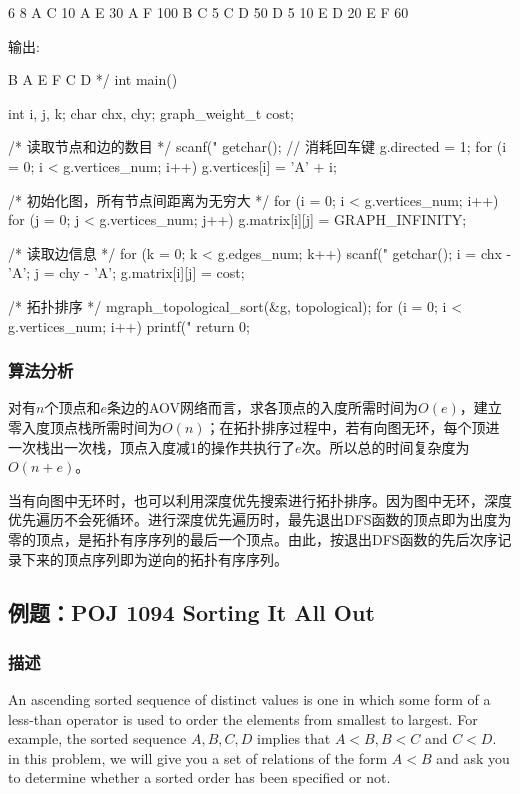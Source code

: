 \begin{Codex}[label=mgraph_topological_sort.c]
6 8
A C 10
A E 30
A F 100
B C 5
C D 50
D 5 10
E D 20
E F 60

输出:

B A E F C D
*/
int main() {
    int i, j, k;
    char chx, chy;
    graph_weight_t cost;

    /* 读取节点和边的数目 */
    scanf("%
    getchar(); // 消耗回车键
    g.directed = 1;
    for (i = 0; i < g.vertices_num; i++) g.vertices[i] = 'A' + i;

    /* 初始化图，所有节点间距离为无穷大 */
    for (i = 0; i < g.vertices_num; i++) {
        for (j = 0; j < g.vertices_num; j++) {
            g.matrix[i][j] = GRAPH_INFINITY;
        }
    }

    /* 读取边信息 */
    for (k = 0; k < g.edges_num; k++) {
        scanf("%
        getchar();
        i = chx - 'A';
        j = chy - 'A';
        g.matrix[i][j] = cost;
    }

    /* 拓扑排序 */
    mgraph_topological_sort(&g, topological);
    for (i = 0; i < g.vertices_num; i++) {
        printf("%
    }
    return 0;
}
\end{Codex}

\subsubsection{算法分析}
对有$n$个顶点和$e$条边的AOV网络而言，求各顶点的入度所需时间为$O(e)$，建立零入度顶点栈所需时间为$O(n)$；在拓扑排序过程中，若有向图无环，每个顶进一次栈出一次栈，顶点入度减1的操作共执行了$e$次。所以总的时间复杂度为$O(n+e)$。

当有向图中无环时，也可以利用深度优先搜索进行拓扑排序。因为图中无环，深度优先遍历不会死循环。进行深度优先遍历时，最先退出DFS函数的顶点即为出度为零的顶点，是拓扑有序序列的最后一个顶点。由此，按退出DFS函数的先后次序记录下来的顶点序列即为逆向的拓扑有序序列。


\subsection{例题：POJ 1094 Sorting It All Out}
\subsubsection{描述}
An ascending sorted sequence of distinct values is one in which some form of a less-than operator is used to order the elements from smallest to largest. For example, the sorted sequence $A, B, C, D$ implies that $A < B, B < C$ and $C < D$. in this problem, we will give you a set of relations of the form $A < B$ and ask you to determine whether a sorted order has been specified or not.

